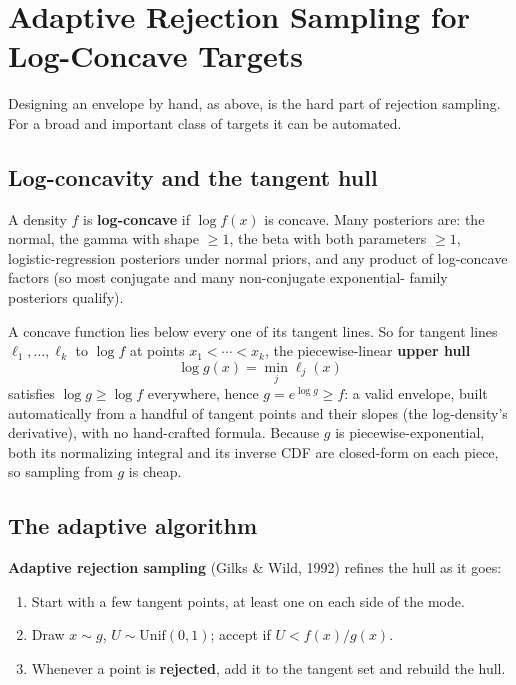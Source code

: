 \documentclass[
  letterpaper,
  DIV=11,
  numbers=noendperiod]{scrreprt}
\providecommand{\tightlist}{%
  \setlength{\itemsep}{0pt}\setlength{\parskip}{0pt}}
\begin{document}
\section{Adaptive Rejection Sampling for Log-Concave
Targets}\label{adaptive-rejection-sampling-for-log-concave-targets}

Designing an envelope by hand, as above, is the hard part of rejection
sampling. For a broad and important class of targets it can be
automated.

\subsection{Log-concavity and the tangent
hull}\label{log-concavity-and-the-tangent-hull}

A density \(f\) is \textbf{log-concave} if \(\log f(x)\) is concave.
Many posteriors are: the normal, the gamma with shape \(\ge 1\), the
beta with both parameters \(\ge 1\), logistic-regression posteriors
under normal priors, and any product of log-concave factors (so most
conjugate and many non-conjugate exponential- family posteriors
qualify).

A concave function lies below every one of its tangent lines. So for
tangent lines \(\ell_1,\ldots,\ell_k\) to \(\log f\) at points
\(x_1 < \cdots < x_k\), the piecewise-linear \textbf{upper hull} \[
\log g(x) = \min_j \ell_j(x)
\] satisfies \(\log g \ge \log f\) everywhere, hence
\(g = e^{\log g} \ge f\): a valid envelope, built automatically from a
handful of tangent points and their slopes (the log-density's
derivative), with no hand-crafted formula. Because \(g\) is
piecewise-exponential, both its normalizing integral and its inverse CDF
are closed-form on each piece, so sampling from \(g\) is cheap.

\subsection{The adaptive algorithm}\label{the-adaptive-algorithm}

\textbf{Adaptive rejection sampling} (Gilks \& Wild, 1992) refines the
hull as it goes:

\begin{enumerate}
\def\labelenumi{\arabic{enumi}.}
\tightlist
\item
  Start with a few tangent points, at least one on each side of the
  mode.
\item
  Draw \(x \sim g\), \(U \sim \text{Unif}(0,1)\); accept if
  \(U < f(x)/g(x)\).
\item
  Whenever a point is \textbf{rejected}, add it to the tangent set and
  rebuild the hull.
\end{enumerate}
\end{document}

